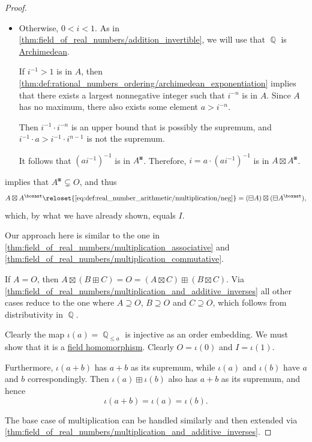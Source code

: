 \begin{proof}
\begin{itemize}
    \item Otherwise, \( 0 < i < 1 \). As in \cref{thm:field_of_real_numbers/addition_invertible}, we will use that \( \BbbQ \) is \hyperref[def:archimedean_semiring]{Archimedean}.

    If \( i^{-1} > 1 \) is in \( A \), then \cref{thm:def:rational_numbers_ordering/archimedean_exponentiation} implies that there exists a largest nonnegative integer such that \( i^{-n} \) is in \( A \). Since \( A \) has no maximum, there also exists some element \( a > i^{-n} \).

    Then \( i^{-1} \cdot i^{-n} \) is an upper bound that is possibly the supremum, and \( i^{-1} \cdot a > i^{-1} \cdot i^{n-1} \) is not the supremum.

    It follows that \( (ai^{-1})^{-1} \) is in \( A^\boxast \). Therefore, \( i = a \cdot (ai^{-1})^{-1} \) is in \( A \boxtimes A^\boxast \).
  \end{itemize}

    implies that \( A^\boxast \subsetneq O \), and thus
  \begin{equation*}
    A \boxtimes A^\boxast
    \reloset {\eqref{eq:def:real_number_arithmetic/multiplication/neg}} =
    (\boxminus A) \boxtimes (\boxminus A^\boxast),
  \end{equation*}
  which, by what we have already shown, equals \( I \).

   Our approach here is similar to the one in \cref{thm:field_of_real_numbers/multiplication_associative} and \cref{thm:field_of_real_numbers/multiplication_commutative}.

  If \( A = O \), then \( A \boxtimes (B \boxplus C) = O = (A \boxtimes C) \boxplus (B \boxtimes C) \). Via \cref{thm:field_of_real_numbers/multiplication_and_additive_inverses} all other cases reduce to the one where \( A \supseteq O \), \( B \supseteq O \) and \( C \supseteq O \), which follows from distributivity in \( \BbbQ \).

   Clearly the map \( \iota(a) = \BbbQ_{\leq a} \) is injective as an order embedding. We must show that it is a \hyperref[def:field/morphism]{field homomorphism}. Clearly \( O = \iota(0) \) and \( I = \iota(1) \).

  Furthermore, \( \iota(a + b) \) has \( a + b \) as its supremum, while \( \iota(a) \) and \( \iota(b) \) have \( a \) and \( b \) correspondingly. Then \( \iota(a) \boxplus \iota(b) \) also has \( a + b \) as its supremum, and hence
  \begin{equation*}
    \iota(a + b) = \iota(a) = \iota(b).
  \end{equation*}

  The base case of multiplication can be handled similarly and then extended via \cref{thm:field_of_real_numbers/multiplication_and_additive_inverses}.
\end{proof}

